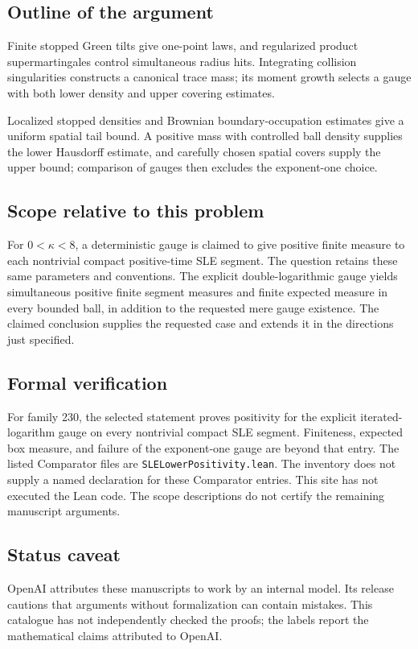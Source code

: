 \documentclass[11pt]{article}
\begin{document}
\subsection{Outline of the argument}
Finite stopped Green tilts give one-point laws, and regularized product supermartingales control simultaneous radius hits. Integrating collision singularities constructs a canonical trace mass; its moment growth selects a gauge with both lower density and upper covering estimates.

Localized stopped densities and Brownian boundary-occupation estimates give a uniform spatial tail bound. A positive mass with controlled ball density supplies the lower Hausdorff estimate, and carefully chosen spatial covers supply the upper bound; comparison of gauges then excludes the exponent-one choice.

\subsection{Scope relative to this problem}
For $0<\kappa<8$, a deterministic gauge is claimed to give positive finite measure to each nontrivial compact positive-time SLE segment. The question retains these same parameters and conventions. The explicit double-logarithmic gauge yields simultaneous positive finite segment measures and finite expected measure in every bounded ball, in addition to the requested mere gauge existence. The claimed conclusion supplies the requested case and extends it in the directions just specified.

\subsection{Formal verification}
For family 230, the selected statement proves positivity for the explicit iterated-logarithm gauge on every nontrivial compact SLE segment. Finiteness, expected box measure, and failure of the exponent-one gauge are beyond that entry. The listed Comparator files are \texttt{SLELowerPositivity.lean}. The inventory does not supply a named declaration for these Comparator entries. This site has not executed the Lean code. The scope descriptions do not certify the remaining manuscript arguments.

\subsection{Status caveat}
OpenAI attributes these manuscripts to work by an internal model. Its release cautions that arguments without formalization can contain mistakes. This catalogue has not independently checked the proofs; the labels report the mathematical claims attributed to OpenAI.
\end{document}
